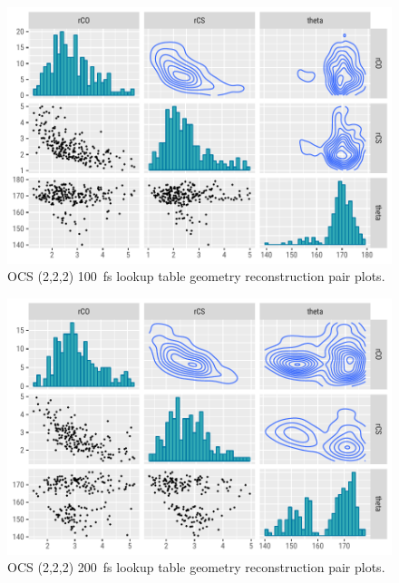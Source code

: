 \begin{figure}
  \centering
  \includegraphics[width=\textwidth]{Plots/OCS222100fsLTGeometryPairPlots}
  \caption[OCS (2,2,2) \SI{100}{\fs} lookup table geometry reconstruction pair plots.]
  {OCS (2,2,2) \SI{100}{\fs} lookup table geometry reconstruction pair plots.}
  \label{fig:OCS222100fsLTGeometryPairPlots}
\end{figure}

\begin{figure}
  \centering
  \includegraphics[width=\textwidth]{Plots/OCS222200fsLTGeometryPairPlots}
  \caption[OCS (2,2,2) \SI{200}{\fs} lookup table geometry reconstruction pair plots.]
  {OCS (2,2,2) \SI{200}{\fs} lookup table geometry reconstruction pair plots.}
  \label{fig:OCS222200fsLTGeometryPairPlots}
\end{figure}